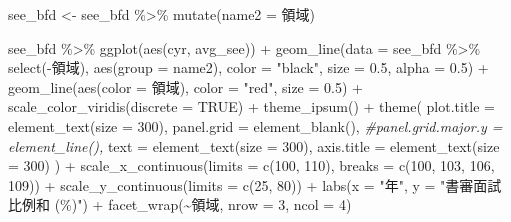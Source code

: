 \documentclass[
]{article}
\newenvironment{Shaded}{\begin{snugshade}}{\end{snugshade}}
\newcommand{\AttributeTok}[1]{\textcolor[rgb]{0.77,0.63,0.00}{#1}}
\newcommand{\CommentTok}[1]{\textcolor[rgb]{0.56,0.35,0.01}{\textit{#1}}}
\newcommand{\ConstantTok}[1]{\textcolor[rgb]{0.00,0.00,0.00}{#1}}
\newcommand{\DecValTok}[1]{\textcolor[rgb]{0.00,0.00,0.81}{#1}}
\newcommand{\FloatTok}[1]{\textcolor[rgb]{0.00,0.00,0.81}{#1}}
\newcommand{\FunctionTok}[1]{\textcolor[rgb]{0.00,0.00,0.00}{#1}}
\newcommand{\NormalTok}[1]{#1}
\newcommand{\OtherTok}[1]{\textcolor[rgb]{0.56,0.35,0.01}{#1}}
\newcommand{\SpecialCharTok}[1]{\textcolor[rgb]{0.00,0.00,0.00}{#1}}
\newcommand{\StringTok}[1]{\textcolor[rgb]{0.31,0.60,0.02}{#1}}
\begin{document}
\begin{Shaded}
\begin{Highlighting}[]
\NormalTok{see\_bfd }\OtherTok{\textless{}{-}}\NormalTok{ see\_bfd }\SpecialCharTok{\%\textgreater{}\%}
  \FunctionTok{mutate}\NormalTok{(}\AttributeTok{name2 =}\NormalTok{ 領域)}

\NormalTok{see\_bfd }\SpecialCharTok{\%\textgreater{}\%}
  \FunctionTok{ggplot}\NormalTok{(}\FunctionTok{aes}\NormalTok{(cyr, avg\_see)) }\SpecialCharTok{+}
    \FunctionTok{geom\_line}\NormalTok{(}\AttributeTok{data =}\NormalTok{ see\_bfd }\SpecialCharTok{\%\textgreater{}\%} \FunctionTok{select}\NormalTok{(}\SpecialCharTok{{-}}\StringTok{\textasciigrave{}}\AttributeTok{領域}\StringTok{\textasciigrave{}}\NormalTok{), }\FunctionTok{aes}\NormalTok{(}\AttributeTok{group =}\NormalTok{ name2), }\AttributeTok{color =} \StringTok{"black"}\NormalTok{, }\AttributeTok{size =} \FloatTok{0.5}\NormalTok{, }\AttributeTok{alpha =} \FloatTok{0.5}\NormalTok{) }\SpecialCharTok{+}
    \FunctionTok{geom\_line}\NormalTok{(}\FunctionTok{aes}\NormalTok{(}\AttributeTok{color =}\NormalTok{ 領域), }\AttributeTok{color =} \StringTok{"red"}\NormalTok{, }\AttributeTok{size =} \FloatTok{0.5}\NormalTok{) }\SpecialCharTok{+}
    \FunctionTok{scale\_color\_viridis}\NormalTok{(}\AttributeTok{discrete =} \ConstantTok{TRUE}\NormalTok{) }\SpecialCharTok{+}
    \FunctionTok{theme\_ipsum}\NormalTok{() }\SpecialCharTok{+}
    \FunctionTok{theme}\NormalTok{(}
      \AttributeTok{plot.title =} \FunctionTok{element\_text}\NormalTok{(}\AttributeTok{size =} \DecValTok{300}\NormalTok{),}
      \AttributeTok{panel.grid =} \FunctionTok{element\_blank}\NormalTok{(),}
      \CommentTok{\#panel.grid.major.y = element\_line(), }
      \AttributeTok{text =} \FunctionTok{element\_text}\NormalTok{(}\AttributeTok{size =} \DecValTok{300}\NormalTok{), }
      \AttributeTok{axis.title =} \FunctionTok{element\_text}\NormalTok{(}\AttributeTok{size =} \DecValTok{300}\NormalTok{)}
\NormalTok{    ) }\SpecialCharTok{+}
    \FunctionTok{scale\_x\_continuous}\NormalTok{(}\AttributeTok{limits =} \FunctionTok{c}\NormalTok{(}\DecValTok{100}\NormalTok{, }\DecValTok{110}\NormalTok{), }\AttributeTok{breaks =} \FunctionTok{c}\NormalTok{(}\DecValTok{100}\NormalTok{, }\DecValTok{103}\NormalTok{, }\DecValTok{106}\NormalTok{, }\DecValTok{109}\NormalTok{)) }\SpecialCharTok{+}
    \FunctionTok{scale\_y\_continuous}\NormalTok{(}\AttributeTok{limits =} \FunctionTok{c}\NormalTok{(}\DecValTok{25}\NormalTok{, }\DecValTok{80}\NormalTok{)) }\SpecialCharTok{+}
    \FunctionTok{labs}\NormalTok{(}\AttributeTok{x =} \StringTok{"年"}\NormalTok{, }\AttributeTok{y =} \StringTok{"書審面試比例和 (\%)"}\NormalTok{) }\SpecialCharTok{+}
    \FunctionTok{facet\_wrap}\NormalTok{(}\SpecialCharTok{\textasciitilde{}}\NormalTok{領域, }\AttributeTok{nrow =} \DecValTok{3}\NormalTok{, }\AttributeTok{ncol =} \DecValTok{4}\NormalTok{)}
\end{Highlighting}
\end{Shaded}
\end{document}
